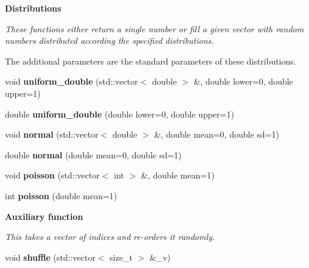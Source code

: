 \begin{Indent}\textbf{ Distributions}\par
{\em These functions either return a single number or fill a given vector with random numbers distributed according the specified distributions.

The additional parameters are the standard parameters of these distributions. }\begin{DoxyCompactItemize}
\item 
\mbox{\label{classRandomNumbers_ae226c129494f9055ac37ed1af943d010}} 
void {\bfseries uniform\+\_\+double} (std\+::vector$<$ double $>$ \&, double lower=0, double upper=1)
\item 
\mbox{\label{classRandomNumbers_a1e66bf9926ad3916f3804dd20ea393f1}} 
double {\bfseries uniform\+\_\+double} (double lower=0, double upper=1)
\item 
\mbox{\label{classRandomNumbers_a4ef5917200da65aa267735d389bdf995}} 
void {\bfseries normal} (std\+::vector$<$ double $>$ \&, double mean=0, double sd=1)
\item 
\mbox{\label{classRandomNumbers_abbfcbae72e7dbd048567dd5b8e2ce9d2}} 
double {\bfseries normal} (double mean=0, double sd=1)
\item 
\mbox{\label{classRandomNumbers_a69e33058b8a923f9597cf13421d5fcd4}} 
void {\bfseries poisson} (std\+::vector$<$ int $>$ \&, double mean=1)
\item 
\mbox{\label{classRandomNumbers_ac5bd95dddabde62a74a0d871a66ce2f0}} 
int {\bfseries poisson} (double mean=1)
\end{DoxyCompactItemize}
\end{Indent}
\begin{Indent}\textbf{ Auxiliary function}\par
{\em This takes a vector of indices and re-\/orders it randomly. }\begin{DoxyCompactItemize}
\item 
\mbox{\label{classRandomNumbers_a851aaa7e46922dc22ce984b21b474a4e}} 
void {\bfseries shuffle} (std\+::vector$<$ size\+\_\+t $>$ \&\+\_\+v)
\end{DoxyCompactItemize}
\end{Indent}


